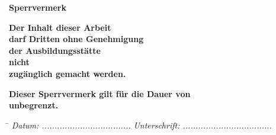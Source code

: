 \begin{center}
	\huge \textbf{Sperrvermerk}
	\vspace{1.5cm}

	\large \textbf{Der Inhalt dieser Arbeit\\darf Dritten ohne Genehmigung\\der Ausbildungsstätte\\nicht\\zugänglich gemacht werden.\\}
	
	\vspace{1.5cm}
	
	\textbf{Dieser Sperrvermerk gilt für die Dauer von\\unbegrenzt.}

\end{center}

\vspace{3cm}
\begin{tabbing}
	\hspace{8cm}  \= \kill
	\textit{Datum: ...................................} \hspace{2cm} \textit{Unterschrift: ...................................}
\end{tabbing}

\pagebreak